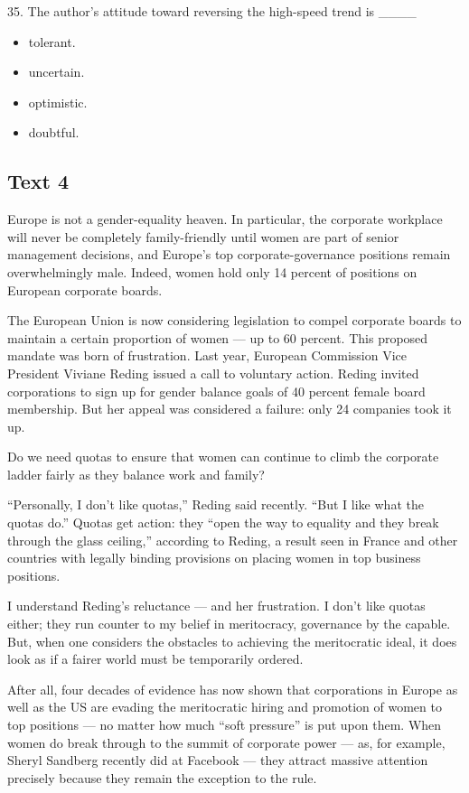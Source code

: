 \documentclass[UTF8,11pt]{ctexart}
\begin{document}
35. The author’s attitude toward reversing the high-speed trend is \_\_\_\_


\begin{itemize}[leftmargin=2em,itemsep=.2em,topsep=.4em]\item[A.] tolerant.
\item[B.] uncertain.
\item[C.] optimistic.
\item[D.] doubtful.
\end{itemize}

\subsection*{\textbf{Text 4}}


Europe is not a gender-equality heaven. In particular, the corporate workplace will never be completely family-friendly until women are part of senior management decisions, and Europe’s top corporate-governance positions remain overwhelmingly male. Indeed, women hold only 14 percent of positions on European corporate boards.


The European Union is now considering legislation to compel corporate boards to maintain a certain proportion of women — up to 60 percent. This proposed mandate was born of frustration. Last year, European Commission Vice President Viviane Reding issued a call to voluntary action. Reding invited corporations to sign up for gender balance goals of 40 percent female board membership. But her appeal was considered a failure: only 24 companies took it up.


Do we need quotas to ensure that women can continue to climb the corporate ladder fairly as they balance work and family?


“Personally, I don’t like quotas,” Reding said recently. “But I like what the quotas do.” Quotas get action: they “open the way to equality and they break through the glass ceiling,” according to Reding, a result seen in France and other countries with legally binding provisions on placing women in top business positions.


I understand Reding’s reluctance — and her frustration. I don’t like quotas either; they run counter to my belief in meritocracy, governance by the capable. But, when one considers the obstacles to achieving the meritocratic ideal, it does look as if a fairer world must be temporarily ordered.


After all, four decades of evidence has now shown that corporations in Europe as well as the US are evading the meritocratic hiring and promotion of women to top positions — no matter how much “soft pressure” is put upon them. When women do break through to the summit of corporate power — as, for example, Sheryl Sandberg recently did at Facebook — they attract massive attention precisely because they remain the exception to the rule.
\end{document}
